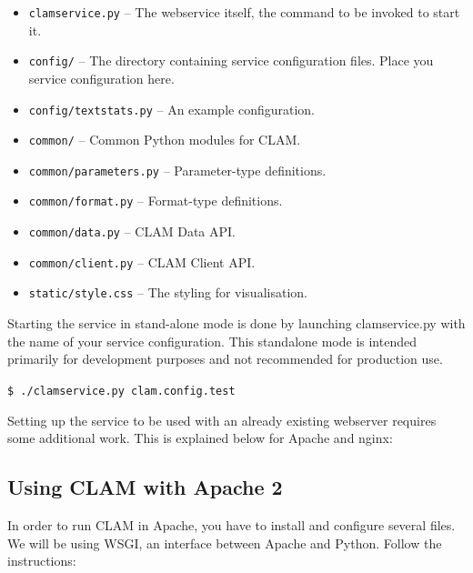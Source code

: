 \documentclass[a4paper,12pt]{report}
\begin{document}
\begin{itemize}
\item \texttt{clamservice.py} -- The webservice itself, the command to be invoked to start it.
\item \texttt{config/} -- The directory containing service configuration files. Place you service configuration here.
\item \texttt{config/textstats.py} -- An example configuration.
\item \texttt{common/} -- Common Python modules for CLAM.
\item \texttt{common/parameters.py} -- Parameter-type definitions.
\item \texttt{common/format.py} -- Format-type definitions.
\item \texttt{common/data.py} -- CLAM Data API.
\item \texttt{common/client.py} -- CLAM Client API.
\item \texttt{static/style.css} -- The styling for visualisation.
\end{itemize}

Starting the service in stand-alone mode is done by launching clamservice.py with the name of your service configuration. This standalone mode is intended primarily for development purposes and not recommended for production use.

\texttt{\$ ./clamservice.py clam.config.test}

Setting up the service to be used with an already existing webserver requires some additional work. This is explained below for Apache and nginx:

\subsection{Using CLAM with Apache 2}

In order to run CLAM in Apache, you have to install and configure several files. We will be using WSGI, an interface between Apache and Python. Follow the instructions:
\end{document}
